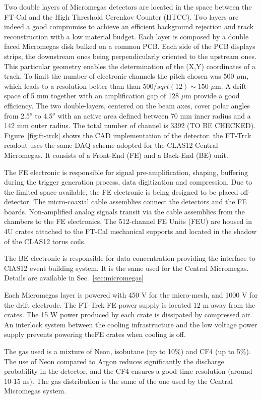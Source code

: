 Two double layers of Micromegas detectors
are located in the space between the FT-Cal
and the High Threshold Cerenkov Counter
(HTCC). Two layers are indeed a good compromise
to achieve an efficient background rejection
and track reconstruction with a low
material budget. Each layer is
composed by a double faced Micromegas disk
bulked on a common PCB. Each side of the
PCB displays strips, the downstream ones being
perpendicularly oriented to the upstream
ones. This particular geometry enables the
determination of the (X,Y) coordinates of a
track. To limit the number of electronic channels
the pitch chosen was 500 $\mu$m, which leads
to a resolution better than than 500/$sqrt(12)\sim 150$ $\mu$m.
A drift space of 5 mm together with an amplification gap of 128  $\mu$m provide
a good efficiency.
The two double-layers, centered on the beam axes,   cover polar angles from 2.5$^o$ to 4.5$^o$ with an active area defined
between 70 mm inner radius and a 142 mm outer radius.
The total number of channel is 3392 (TO BE CHECKED).
Figure~\ref{fig:ft-trck} shows the CAD implementation of the detector. 
the FT-Trck readout uses the same DAQ scheme adopted for the CLAS12 Central Micromegas. It  consists
of a Front-End (FE) and a  Back-End (BE) unit. 

The FE
electronic is responsible for signal pre-amplification, shaping,  buffering during the trigger generation
process, data digitization and compression.
Due to the limited space available, the FE electronic 
is being designed to be placed off-detector.
The micro-coaxial cable assemblies
connect the detectors and the FE boards. Non-amplified
analog signals transit via the cable
assemblies from the chambers to the FE electronics.
The 512-channel FE Units (FEU)
 are housed in 4U crates attached to the FT-Cal mechanical supports and  located
in the shadow of the CLAS12 torus coils.

The  BE electronic is
responsible for data concentration providing the 
interface to ClAS12
event building system. It is the same used for the Central Micromegas. Details are available in Sec.~\ref{sec:micromegas}

Each Micromegas layer  is powered with 
 450 V for the micro-mesh,
and 1000 V for the drift electrode.
The FT-Trck FE power supply is located 12 m away from the crates. The 15 W power produced by each crate is dissipated  by compressed air. An interlock system between the cooling
infrastructure and the low voltage power supply
prevents powering theFE crates
when cooling is off. 

The gas used 
is a mixture of Neon, isobutane (up to
10$\%$) and CF4 (up to 5$\%$). The use of Neon
compared to Argon reduces significantly the
discharge probability in the detector, and the
CF4 ensures a good time resolution (around
10-15 ns). The gas distribution is the same of the one used by the Central Micromegas system.


